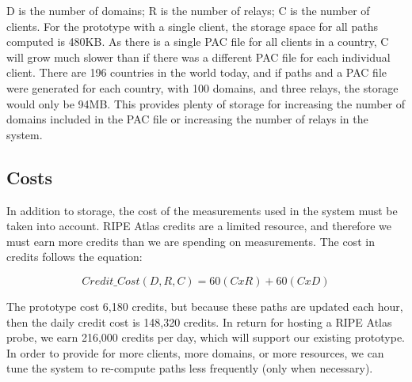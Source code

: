 D is the number of domains; R is the number of relays; C is the number of 
clients.  For the prototype with a single client, the storage space for all 
paths computed is 480KB.  As there is a single PAC file for all clients in 
a country, C will grow much slower than if there was a different PAC file for 
each individual client.  There are 196 countries in the world today, and if 
paths and a PAC file were generated for each country, with 100 domains, and 
three relays, the storage would only be 94MB.  This provides plenty of storage 
for increasing the number of domains included in the PAC file or increasing 
the number of relays in the system.

\subsection{Costs}
In addition to storage, the cost of the measurements used in the system must 
be taken into account.  RIPE Atlas credits are a limited resource, and therefore 
we must earn more credits than we are spending on measurements.  The cost 
in credits follows the equation:

\[Credit\_Cost(D,R,C) = 60(C x R) + 60(C x D)\]

The prototype cost 6,180 credits, but because these paths are updated each hour, then 
the daily credit cost is 148,320 credits.  In return for hosting a RIPE Atlas 
probe, we earn 216,000 credits per day, which will support our existing 
prototype.  In order to provide for more clients, more domains, or more 
resources, we can tune the system to re-compute paths less frequently (only when necessary).
